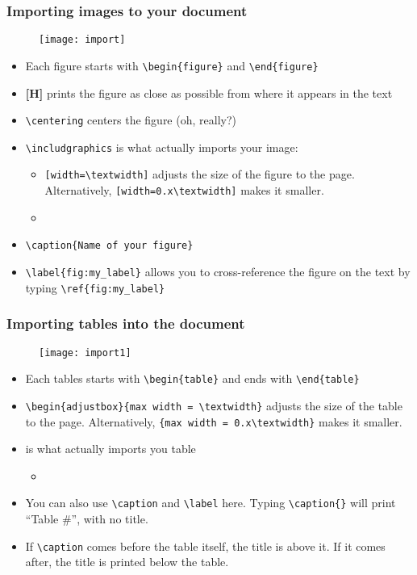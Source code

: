 \documentclass{beamer}
\begin{document}
\begin{frame}[fragile]
	\frametitle{Importing images to your document}
	\begin{figure}
		\texttt{[image: import]}
	\end{figure}
\begin{itemize}
	\tiny
	\item Each figure starts with \verb|\begin{figure}| and \verb|\end{figure}|
	\item \textbf{[H]} prints the figure as close as possible from where it appears in the text
	\item \verb|\centering| centers the figure (oh, really?)
	\item \verb|\includgraphics| is what actually imports your image:
	\begin{itemize}
		\tiny
		\item \verb|[width=\textwidth]| adjusts the size of the figure to the page. Alternatively, \verb|[width=0.x\textwidth]| makes it smaller.
		\item \color{red}{The path to your figure must begin from the same folder where your .tex file is!}
	\end{itemize}
	\item \verb|\caption{Name of your figure}|
	\item \verb|\label{fig:my_label}| allows you to cross-reference the figure on the text by typing \verb|\ref{fig:my_label}|
\end{itemize}
\end{frame}
\begin{frame}[fragile]
	\frametitle{Importing tables into the document}
	\begin{figure}
		\centering
		\texttt{[image: import1]}
	\end{figure}
	\begin{itemize}
		\tiny
		\item Each tables starts with \verb|\begin{table}| and ends with \verb|\end{table}|
		\item \verb|\begin{adjustbox}{max width = \textwidth}| adjusts the size of the table to the page. Alternatively, \verb|{max width = 0.x\textwidth}| makes it smaller.
		\item \verb|| is what actually imports you table
			\begin{itemize}
				\tiny
				\item \color{red}{The path to your figure must begin from the same folder where your .tex file is!}
			\end{itemize}
		\item You can also use \verb|\caption| and \verb|\label| here.  Typing \verb|\caption{}| will print “Table \#”, with no title.
		\item If \verb|\caption| comes before the table itself, the title is above it. If it comes after, the title is printed below the table.
	\end{itemize}
\end{frame}
\end{document}

